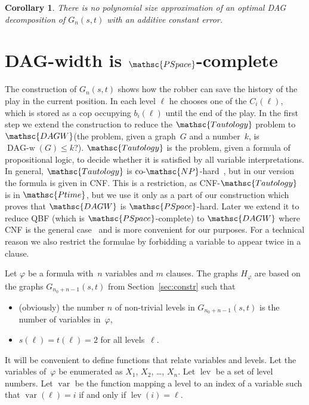 \documentclass[authoryear]{article}
\newtheorem{corollary}[theorem]{Corollary}
\theoremstyle{definition}
\DeclareMathOperator{\var}{var}
\DeclareMathOperator{\lev}{lev}
\renewcommand{\phi}{\varphi}
\newcommand{\0}{\emptyset}
\newcommand{\ptime}{\ensuremath{\mathsc{Ptime}}\xspace}
\newcommand{\conp}{\ensuremath{\text{co-}\mathsc{NP}}\xspace}
\newcommand{\pspace}{\ensuremath{\mathsc{PSpace}}\xspace}
\newcommand{\DAGWprob}{\ensuremath{\mathsc{DAGW}}\xspace}
\newcommand{\taut}{\ensuremath{\mathsc{Tautology}}\xspace}
\newcommand{\dagw}{DAG-{}width\xspace}
\DeclareMathOperator{\DAGW}{DAG\text{-}w}
\begin{document}
\begin{corollary}
There is no polynomial size approximation of an optimal DAG
decomposition of $G_n(s,t) $ with an additive constant error. 
\end{corollary}
 
\section{\dagw is \pspace-complete}
\label{sec:pspace}

The construction of $G_n(s,t)$ shows how the robber can save the history of the
play in the current position. In each level $\ell$ he chooses one of the
$C_i(\ell)$, which is stored as a cop occupying $b_i(\ell)$ until the end of the
play. In the first step we extend the construction to reduce the \taut problem
to \DAGWprob (the problem, given a graph~$G$ and a number~$k$, is
$\DAGW(G)\le k$?).  \taut is the problem, given a formula of propositional
logic, to decide whether it is satisfied by all variable interpretations. In
general, \taut is \conp-hard~\cite[Problem {[}LO8{]}]{GareyJoh79}, but in our
version the formula is given in CNF. This is a restriction, as CNF-\taut is in
\ptime, but we use it only as a part of our construction which proves that
\DAGWprob is \pspace-hard. Later we extend it to reduce QBF (which is
\pspace-complete) to \DAGWprob where CNF is the general case~\cite[Theorem
7.10]{GareyJoh79} and is more convenient for our purposes. For a technical
reason we also restrict the formulae by forbidding a variable to appear twice in
a clause.

Let $\phi$ be a formula with~$n$ variables and $m$ clauses. The graphs $H_\phi$
are based on the graphs $G_{n_0+n-1}(s,t)$ from Section~\ref{sec:constr} such that
\begin{itemize}
\item (obviously) the number $n$ of non-trivial levels in $G_{n_0+n-1}(s,t)$ is
  the number of variables in~$\phi$,

\item $s(\ell) = t(\ell) = 2$ for all levels~$\ell$.
\end{itemize}

It will be convenient to define functions that relate variables and levels.
Let the variables of~$\phi$ be enumerated as $X_1$, $X_2$, \ldots, $X_n$. Let 
$\lev$ be a set of level numbers. Let $\var$ be the function mapping a level to an 
index of a variable such that $\var(\ell) = i$ if and only if $\lev(i) = \ell$.
\end{document}
